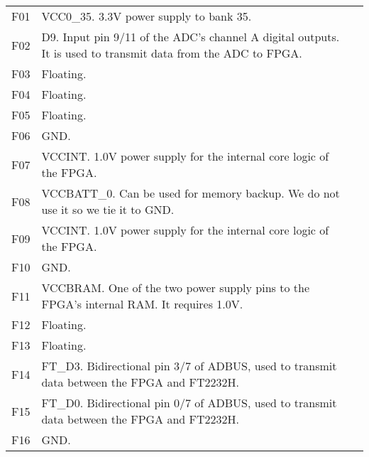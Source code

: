 \begin{tabularx}{\textwidth}{c X>{\raggedright\arraybackslash}X}
        F01 & VCC0\_35. 3.3V power supply to bank 35. \\
        F02 & D9. Input pin 9/11 of the ADC's channel A digital outputs. It is used to transmit data from
        the ADC to FPGA. \\
        F03 & Floating. \\
        F04 & Floating. \\
        F05 & Floating. \\
        F06 & GND. \\
        F07 & VCCINT. 1.0V power supply for the internal core logic of the FPGA. \\
        F08 & VCCBATT\_0. Can be used for memory backup. We do not use it so we tie it to GND. \\
        F09 & VCCINT. 1.0V power supply for the internal core logic of the FPGA. \\
        F10 & GND. \\
        F11 & VCCBRAM. One of the two power supply pins to the FPGA's internal RAM. It requires 1.0V. \\
        F12 & Floating. \\
        F13 & Floating. \\
        F14 & FT\_D3. Bidirectional pin 3/7 of ADBUS, used to transmit data between the FPGA and
        FT2232H. \\
        F15 & FT\_D0. Bidirectional pin 0/7 of ADBUS, used to transmit data between the FPGA and
        FT2232H. \\
        F16 & GND. \\

        \midrule


\end{tabularx}

